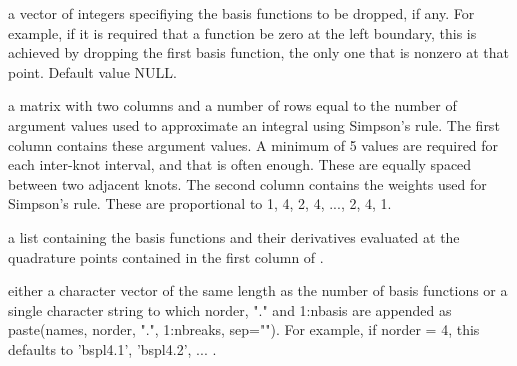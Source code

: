 \documentclass{article}
\begin{document}
\begin{Arguments}
\begin{ldescription}
\item[\code{dropind}] a vector of integers specifiying the basis functions to
be dropped, if any.  For example, if it is required that
a function be zero at the left boundary, this is achieved
by dropping the first basis function, the only one that
is nonzero at that point. Default value NULL.

\item[\code{quadvals}] a matrix with two columns and a number of rows equal to the number 
of argument values used to approximate an integral using Simpson's
rule.  The first column contains these argument values.
A minimum of 5 values are required for
each inter-knot interval, and that is often enough. These
are equally spaced between two adjacent knots.
The second column contains the weights used for Simpson's
rule.  These are proportional to 1, 4, 2, 4, ..., 2, 4, 1.

\item[\code{values}] a list containing the basis functions and their derivatives
evaluated at the quadrature points contained in the first
column of .

\item[\code{names}] either a character vector of the same length as the number of basis 
functions or a single character string to which norder, "." and
1:nbasis are appended as paste(names, norder, ".", 1:nbreaks,
sep="").  For example, if norder = 4, this defaults to 'bspl4.1',
'bspl4.2', ... .   

\end{ldescription}
\end{Arguments}
\end{document}
